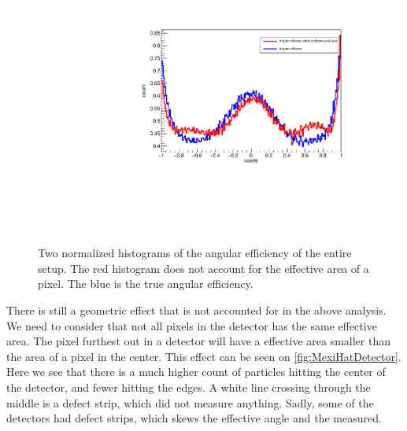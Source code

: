 \begin{figure}[h]
	\includegraphics[width=\linewidth]{../figures/allDetEff.pdf}
	\caption{Two normalized histograms of the angular efficiency of the entire setup. The red histogram does not account for the effective area of a pixel. The blue is the true angular efficiency.}
	\label{fig:effAllDet}
\end{figure}
There is still a geometric effect that is not accounted for in the above analysis. We need to consider that not all pixels in the detector has the same effective area. 
The pixel furthest out in a detector will have a effective area smaller than the area of a pixel in the center. This effect can be seen on \cref{fig:MexiHatDetector}. Here we see that there is a much higher count of particles hitting the center of the detector, and fewer hitting the edges. A white line crossing through the middle is a defect strip, which did not measure anything. Sadly, some of the detectors had defect strips, which skews the effective angle and the measured. 
